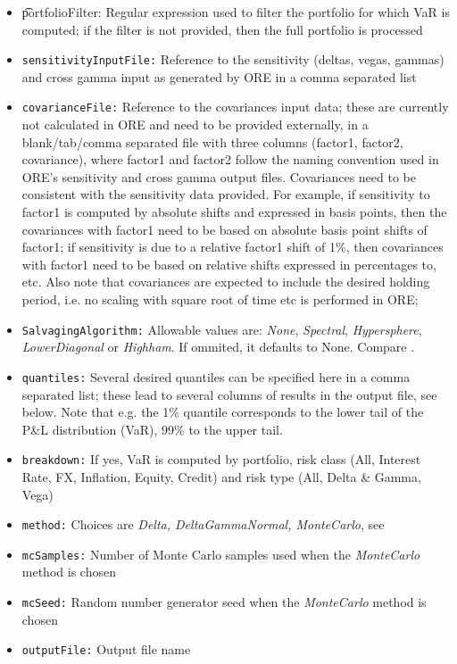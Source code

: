 {\begin{itemize}
\item {\t portfolioFilter:} Regular expression used to filter the portfolio for which VaR is computed; if the filter is not provided, then the full portfolio is processed
\item {\tt sensitivityInputFile:} Reference to the sensitivity (deltas, vegas, gammas) and cross gamma input as generated by ORE in a comma separated list
\item {\tt covarianceFile:} Reference to the covariances input data; these are currently not calculated in ORE and need to be provided externally, in a blank/tab/comma separated file with three columns (factor1, factor2, covariance), where factor1 and factor2 follow the naming convention used in ORE's sensitivity and cross gamma output files. Covariances need to be consistent with the sensitivity data provided. For example, if sensitivity to factor1 is computed by absolute shifts and expressed in basis points, then the covariances with factor1 need to be based on absolute basis point shifts of factor1; if sensitivity is due to a relative factor1 shift of 1\%, then covariances with factor1 need to be based on relative shifts expressed in percentages to, etc. Also note that covariances are expected to include the desired holding period, i.e. no scaling with square root of time etc is performed in ORE; 
\item {\tt SalvagingAlgorithm:} Allowable values are: {\em None}, {\em Spectral}, {\em Hypersphere}, {\em LowerDiagonal} or {\em Highham}. If ommited, it defaults to None. Compare \cite{corrSalv}.
\item {\tt quantiles:} Several desired quantiles can be specified here in a comma separated list; these lead to several columns of results in the output file, see below. Note that e.g. the 1\% quantile corresponds to the lower tail of the P\&L distribution (VaR), 99\% to the upper tail.
\item {\tt breakdown:} If yes, VaR is computed by portfolio, risk class (All, Interest Rate, FX, Inflation, Equity, Credit) and risk type (All, Delta \& Gamma, Vega)
\item {\tt method:} Choices are {\em Delta, DeltaGammaNormal, MonteCarlo}, see \cite{methods}
\item {\tt mcSamples:} Number of Monte Carlo samples used when the {\em MonteCarlo} method is chosen 
\item {\tt mcSeed:} Random number generator seed when the {\em MonteCarlo} method is chosen
\item {\tt outputFile:} Output file name
\end{itemize}

}
